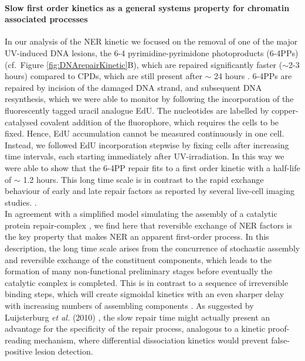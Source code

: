 \paragraph{Slow first order kinetics as a general systems property for chromatin associated processes}
In our analysis of the NER kinetic we focused on the removal of one of the major UV-induced DNA lesions, the 6-4 pyrimidine-pyrimidone photoproducts (6-4PPs) (cf.\ Figure \ref{fig:DNArepairKinetic}B), which are repaired significantly faster ($\sim$2-3 hours) compared to CPDs, which are still present after $\sim$ 24 hours \cite{Smerdon1978,vanHoffen:1995:EMBO-J:7835346,Luijsterburg2010}. 6-4PPs are repaired by incision of the damaged DNA strand, and subsequent DNA resynthesis, which we were able to monitor by following the incorporation of the fluorescently tagged uracil analogue EdU. The nucleotides are labelled by copper-catalysed covalent addition of the fluorophore, which requires the cells to be fixed. Hence, EdU accumulation cannot be measured continuously in one cell. Instead, we followed EdU incorporation stepwise by fixing cells after increasing time intervals, each starting immediately after UV-irradiation. In this way we were able to show that the 6-4PP repair fits to a first order kinetic with a half-life of $\sim$ 1.2 hours.         
This long time scale is in contrast to the rapid exchange behaviour of early and late repair factors as reported by several live-cell imaging studies. \cite{Houtsmuller1999,Volker2001,Hoogstraten2002,Rademakers2003,Mone2004,Zotter2006,Hoogstraten2008,Luijsterburg2010}. \\
In agreement with a simplified model simulating the assembly of a catalytic protein repair-complex \cite{Terstiege2010}, we find here that reversible exchange of NER factors is the key property that makes NER an apparent first-order process. In this description, the long time scale arises from the concurrence of stochastic assembly and reversible exchange of the constituent components, which leads to the formation of many non-functional preliminary stages before eventually the catalytic complex is completed. This is in contrast to a sequence of irreversible binding steps, which will create sigmoidal kinetics with an even sharper delay with increasing numbers of assembling components \cite{Terstiege2010}. As suggested by Luijsterburg \textit{et al.} (2010) \cite{Luijsterburg2010}, the slow repair time might actually present an advantage for the specificity of the repair process, analogous to a kinetic proof-reading mechanism, where differential dissociation kinetics would prevent false-positive lesion detection. \\ 
